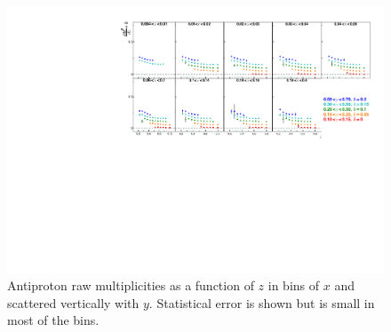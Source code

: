 \begin{figure}[!h]
  \includegraphics[scale=0.85]{./gfx/rawpm.pdf}
  \caption{Antiproton raw multiplicities as a function of $z$ in bins of $x$ and scattered vertically with $y$. Statistical error is shown but is small in most of the bins.}
  \label{pic:rawpm}
\end{figure}
